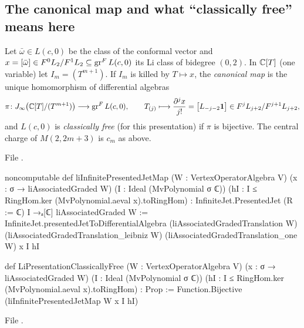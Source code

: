 \subsection{The canonical map and what ``classically free'' means here}

\begin{definition}\label{l20:def:vircanon}
Let $\bar\omega\in L(c,0)$ be the class of the conformal vector and $x=[\bar\omega]\in F^0L_2/F^1L_2\subseteq\operatorname{gr}^F L(c,0)$
its Li class of bidegree $(0,2)$. In ${\mathbb{C}}[T]$ (one variable) let $I_m=(T^{m+1})$. If $I_m$ is killed by $T\mapsto x$, the
\emph{canonical map} is the unique homomorphism of differential algebras
\begin{equation*}
\pi\colon J_\infty\bigl({\mathbb{C}}[T]/(T^{m+1})\bigr)\longrightarrow\operatorname{gr}^F L(c,0),\qquad T_{(j)}\longmapsto\frac{\partial^jx}{j!}
=\bigl[L_{-j-2}\mathbf{1}\bigr]\in F^jL_{j+2}/F^{j+1}L_{j+2},
\end{equation*}
and $L(c,0)$ is \emph{classically free} (for this presentation) if $\pi$ is bijective. The central charge of $M(2,2m+3)$ is
$c_m$ as above.
\end{definition}
\noindent File .
\begin{leancode}
noncomputable def liInfinitePresentedJetMap (W : VertexOperatorAlgebra V)
    (x : σ → liAssociatedGraded W) (I : Ideal (MvPolynomial σ ℂ))
    (hI : I ≤ RingHom.ker (MvPolynomial.aeval x).toRingHom) :
    InfiniteJet.PresentedJet (R := ℂ) I →ₐ[ℂ] liAssociatedGraded W :=
  InfiniteJet.presentedJetToDifferentialAlgebra (liAssociatedGradedTranslation W)
    (liAssociatedGradedTranslation_leibniz W) (liAssociatedGradedTranslation_one W) x I hI

def LiPresentationClassicallyFree (W : VertexOperatorAlgebra V)
    (x : σ → liAssociatedGraded W) (I : Ideal (MvPolynomial σ ℂ))
    (hI : I ≤ RingHom.ker (MvPolynomial.aeval x).toRingHom) : Prop :=
  Function.Bijective (liInfinitePresentedJetMap W x I hI)
\end{leancode}
\noindent File .
